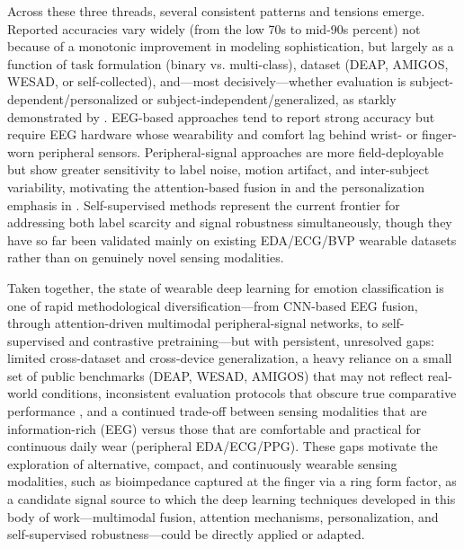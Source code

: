 Across these three threads, several consistent patterns and tensions emerge. Reported accuracies vary widely (from the low 70s to mid-90s percent) not because of a monotonic improvement in modeling sophistication, but largely as a function of task formulation (binary vs. multi-class), dataset (DEAP, AMIGOS, WESAD, or self-collected), and---most decisively---whether evaluation is subject-dependent/personalized or subject-independent/generalized, as starkly demonstrated by \cite{li2024comparison}. EEG-based approaches \cite{kwon2018electroencephalography,moontaha2023online,mai2023real} tend to report strong accuracy but require EEG hardware whose wearability and comfort lag behind wrist- or finger-worn peripheral sensors. Peripheral-signal approaches \cite{filippini2022automated,baldassarri2023wearables,zou2024emotion,kumar2024machine} are more field-deployable but show greater sensitivity to label noise, motion artifact, and inter-subject variability, motivating the attention-based fusion in \cite{zou2024emotion} and the personalization emphasis in \cite{li2024comparison}. Self-supervised methods \cite{dissanayake2022sigrep,wu2023transformer} represent the current frontier for addressing both label scarcity and signal robustness simultaneously, though they have so far been validated mainly on existing EDA/ECG/BVP wearable datasets rather than on genuinely novel sensing modalities.

Taken together, the state of wearable deep learning for emotion classification is one of rapid methodological diversification---from CNN-based EEG fusion, through attention-driven multimodal peripheral-signal networks, to self-supervised and contrastive pretraining---but with persistent, unresolved gaps: limited cross-dataset and cross-device generalization, a heavy reliance on a small set of public benchmarks (DEAP, WESAD, AMIGOS) that may not reflect real-world conditions, inconsistent evaluation protocols that obscure true comparative performance \cite{saganowski2022emotion}, and a continued trade-off between sensing modalities that are information-rich (EEG) versus those that are comfortable and practical for continuous daily wear (peripheral EDA/ECG/PPG). These gaps motivate the exploration of alternative, compact, and continuously wearable sensing modalities, such as bioimpedance captured at the finger via a ring form factor, as a candidate signal source to which the deep learning techniques developed in this body of work---multimodal fusion, attention mechanisms, personalization, and self-supervised robustness---could be directly applied or adapted.

